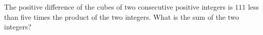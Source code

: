 The positive difference of the cubes of two consecutive positive integers is $111$ less than five times the product of the two integers. What is the sum of the two integers?

